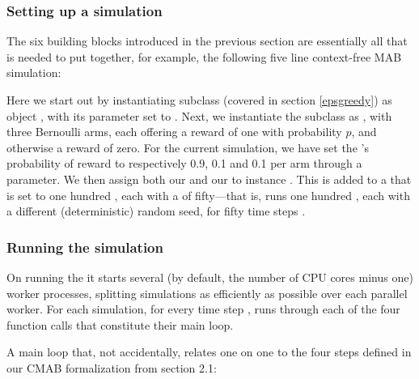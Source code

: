 \documentclass{jss}
\begin{document}
\subsubsection{Setting up a simulation}

The six building blocks introduced in the previous section are essentially all that is needed to put together, for example, the following five line context-free MAB simulation:


Here we start out by instantiating  subclass  (covered in section \ref{epsgreedy}) as object , with its parameter  set to . Next, we instantiate the  subclass  as , with three Bernoulli arms, each offering a reward of one with probability $p$, and otherwise a reward of zero. For the current simulation, we have set the 's probability of reward to respectively 0.9, 0.1 and 0.1 per arm through a  parameter. We then assign both our  and our  to  instance . This  is  added to a  that is set to one hundred , each with a  of fifty---that is,  runs one hundred , each with a different (deterministic) random seed, for fifty time steps .

\subsubsection{Running the simulation}

On running the  it starts several (by default, the number of CPU cores minus one) worker processes, splitting simulations as efficiently as possible over each parallel worker. For each simulation, for every time step ,  runs through each of the four function calls that constitute their main loop.

A main loop that, not accidentally, relates one on one to the four steps defined in our CMAB formalization from section 2.1:
\end{document}
